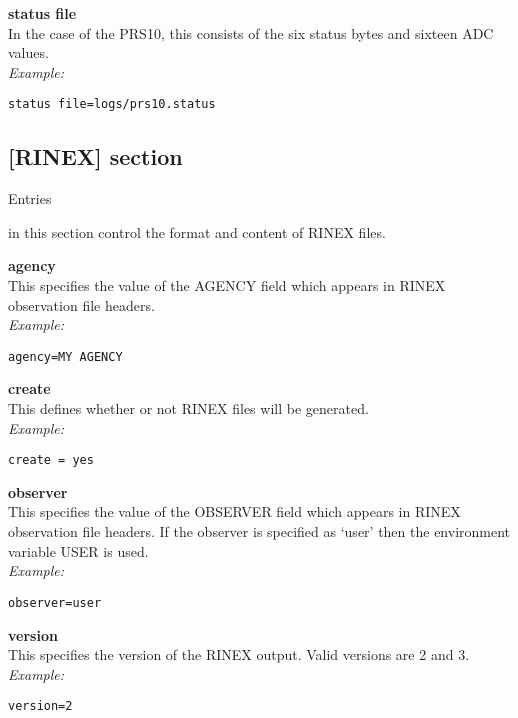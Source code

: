 {\bfseries status file}\\
In the case of the PRS10, this consists of the six status bytes and sixteen ADC values.\\
\textit{Example:}
\begin{lstlisting}
status file=logs/prs10.status
\end{lstlisting}


\subsection{[RINEX] section}

\hypertarget{h:rinex}{Entries} in this section control the format and content of RINEX files.

{\bfseries agency}\\
This specifies the value of the AGENCY field which appears in RINEX observation file headers.\\
\textit{Example:}
\begin{lstlisting}
agency=MY AGENCY
\end{lstlisting}

{\bfseries create}\\
This defines whether or not RINEX files will be generated.\\
\textit{Example:}
\begin{lstlisting}
create = yes
\end{lstlisting}

{\bfseries observer}\\
This specifies the value of the OBSERVER field which appears in RINEX observation file headers.
If the observer is specified as `user' then the environment variable USER is used.\\
\textit{Example:}
\begin{lstlisting}
observer=user
\end{lstlisting}

{\bfseries version}\\
This  specifies the version of the RINEX output. Valid versions are 2 and 3.\\
\textit{Example:}
\begin{lstlisting}
version=2
\end{lstlisting}


